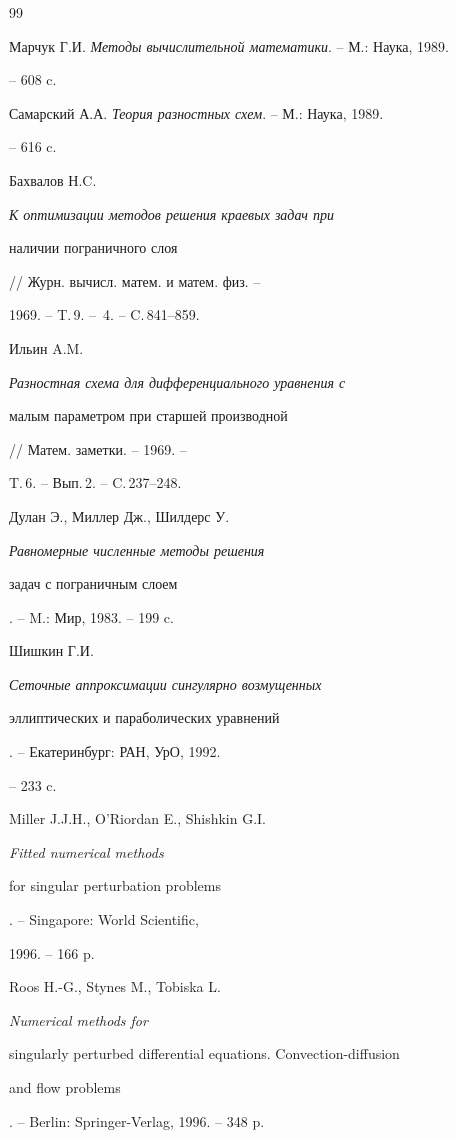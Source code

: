 \begin{thebibliography}{99}




{Марчук Г.И.} {\em Методы вычислительной математики}. -- М.: Наука, 1989.


-- 608 c.




{Самарский А.А.} {\em Теория разностных схем}. -- М.: Наука, 1989.


-- 616 c.




{Бахвалов Н.C.} {\em К оптимизации методов решения краевых задач при


наличии пограничного слоя} // Журн. вычисл. матем. и матем. физ. --


1969. -- T.\,9. -- \No\,4. -- C.\,841--859.




{Ильин A.M.} {\em Разностная схема для дифференциального уравнения с


малым параметром при старшей производной} // Матем. заметки. -- 1969. --


T.\,6. -- Вып.\,2. -- C.\,237--248.




{Дулан Э., Миллер Дж., Шилдерс У.} {\em Равномерные численные методы решения


задач с пограничным слоем}. -- M.: Мир, 1983. -- 199 c.




{Шишкин Г.И.} {\em Сеточные аппроксимации сингулярно возмущенных


эллиптических и параболических уравнений}. -- Екатеринбург: РАН, УрО, 1992.


-- 233 c.




{Miller J.J.H., O'Riordan E., Shishkin G.I.} {\em Fitted numerical methods


for singular perturbation problems}. -- Singapore: World Scientific,


1996. -- 166 p.




{Roos H.-G., Stynes M., Tobiska L.} {\em Numerical methods for


singularly perturbed differential equations. Convection-diffusion


and flow problems}. -- Berlin: Springer-Verlag, 1996. -- 348 p.





\end{thebibliography}
